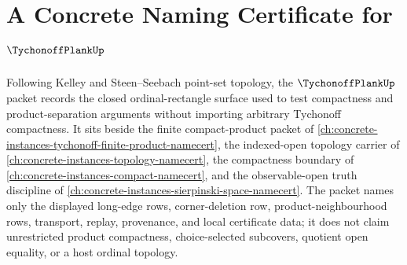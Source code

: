 \chapter{A Concrete Naming Certificate for $\TychonoffPlankUp$}
\label{ch:concrete-instances-tychonoff-plank-namecert}

Following Kelley and Steen--Seebach point-set topology, the $\TychonoffPlankUp$ packet records the closed ordinal-rectangle surface used to test compactness and product-separation arguments without importing arbitrary Tychonoff compactness. It sits beside the finite compact-product packet of \autoref{ch:concrete-instances-tychonoff-finite-product-namecert}, the indexed-open topology carrier of \autoref{ch:concrete-instances-topology-namecert}, the compactness boundary of \autoref{ch:concrete-instances-compact-namecert}, and the observable-open truth discipline of \autoref{ch:concrete-instances-sierpinski-space-namecert}. The packet names only the displayed long-edge rows, corner-deletion row, product-neighbourhood rows, transport, replay, provenance, and local certificate data; it does not claim unrestricted product compactness, choice-selected subcovers, quotient open equality, or a host ordinal topology.

